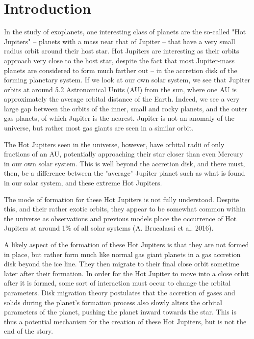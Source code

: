 \documentclass[12pt]{article}
\begin{document}
\clearpage

\section{Introduction}

In the study of exoplanets, one interesting class of planets are the so-called "Hot Jupiters" -- planets with a mass near that of Jupiter -- that have a 
very small radius orbit around their host star. 
Hot Jupiters are interesting as their orbits approach very close to the host star,
despite the fact that most Jupiter-mass planets are considered to form much farther
out -- in the accretion disk of the forming planetary system. If we look at our own
solar system, we see that Jupiter orbits at around 5.2 Astronomical Units (AU) from the
sun, where one AU is approximately the average orbital distance of the Earth. Indeed,
we see a very large gap between the orbits of the inner, small and rocky planets, and
the outer gas planets, of which Jupiter is the nearest. Jupiter is not an anomaly of
the universe, but rather most gas giants are seen in a similar orbit. 

The Hot Jupiters seen in the universe, however, have orbital 
radii of only fractions of an AU, potentially 
approaching their star closer than even Mercury in our own solar system.
This is well beyond the accretion disk, and there must, then, be a difference between
the "average" Jupiter planet such as what is found in our solar system, and these
extreme Hot Jupiters.

The mode of formation for these Hot Jupiters is not fully understood.
Despite this, and their rather exotic orbits, 
they appear to be somewhat common within the universe as observations and previous models place the occurrence of Hot Jupiters at around 1\% of all solar systems (A. Brucalassi et al. 2016).  

A likely aspect of the formation of these Hot Jupiters is that they are not formed in place, but rather form much like normal gas giant planets 
in a gas accretion disk beyond the ice line. They then migrate to their final close orbit sometime later after their formation. 
In order for the Hot Jupiter to move into a close orbit after it is formed, some sort of interaction must occur to change the orbital parameters. 
Disk migration theory postulates that the accretion of gases and 
solids during the planet's formation process also slowly alters the orbital 
parameters of the planet,
pushing the planet inward towards the star.
This is thus a potential mechanism for the creation of these Hot Jupiters, but is not the end of the story.
\end{document}
